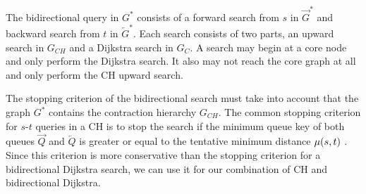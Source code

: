 The bidirectional query in $G^*$ consists of a forward search from $s$ in $\overrightarrow{G}^*$ and backward search from $t$ in $\overleftarrow{G}^*$. Each search consists of two parts, an upward search in $G_{CH}$ and a Dijkstra search in $G_C$. A search may begin at a core node and only perform the Dijkstra search. It also may not reach the core graph at all and only perform the CH upward search.

The stopping criterion of the bidirectional search must take into account that the graph $G^*$ contains the contraction hierarchy $G_{CH}$. The common stopping criterion for $s$-$t$ queries in a CH is to stop the search if the minimum queue key of both queues $\overrightarrow{Q}$ and $\overleftarrow{Q}$ is greater or equal to the tentative minimum distance $\mu(s,t)$ \cite{geisberger:2012}. Since this criterion is more conservative than the stopping criterion for a bidirectional Dijkstra search, we can use it for our combination of CH and bidirectional Dijkstra.

